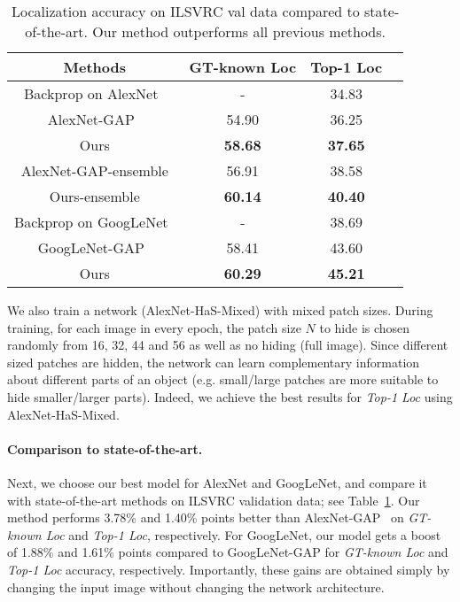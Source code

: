 \documentclass[10pt,twocolumn,letterpaper]{article}
\begin{document}
\begin{table}[t!]
\begin{center}
    \footnotesize
    \begin{tabular}{| c | c | c| c|}
    \hline    	
    Methods & GT-known Loc &  Top-1 Loc    \\
    \hline
    Backprop on AlexNet~\cite{simonyan-iclr2014} & - & 34.83 \\
    AlexNet-GAP~\cite{zhou-cvpr2016}  &  54.90 & 36.25\\
    
    Ours         & \textbf{58.68} & \textbf{37.65}  \\
    \hline
    AlexNet-GAP-ensemble   & 56.91 & 38.58 \\
    Ours-ensemble       & \textbf{60.14} & \textbf{40.40}   \\
            \hline
     Backprop on GoogLeNet~\cite{simonyan-iclr2014} & - & 38.69 \\
         GoogLeNet-GAP~\cite{zhou-cvpr2016} & 58.41 & 43.60 \\
         Ours         &  \textbf{60.29} & \textbf{45.21} \\
     \hline
    \end{tabular}
    \caption{Localization accuracy on ILSVRC val data compared to state-of-the-art.  Our method outperforms all previous methods.}
    \label{table:main_results}
\end{center}
\vspace*{-0.15in}
\end{table}
We also train a network (AlexNet-HaS-Mixed) with mixed patch sizes. During training, for each image in every epoch, the patch size $N$ to hide is chosen randomly from 16, 32, 44 and 56 as well as no hiding (full image).  Since different sized patches are hidden, the network can learn complementary information about different parts of an object (e.g. small/large patches are more suitable to hide smaller/larger parts). Indeed, we achieve the best results for \emph{Top-1 Loc} using AlexNet-HaS-Mixed. 

\vspace{-10pt}\paragraph{Comparison to state-of-the-art.}  Next, we choose our best model for AlexNet and GoogLeNet, and compare it with state-of-the-art methods on ILSVRC validation data; see Table~\ref{table:main_results}. Our method performs 3.78\% and 1.40\% points better than AlexNet-GAP~\cite{zhou-cvpr2016} on \emph{GT-known Loc} and \emph{Top-1 Loc}, respectively. For GoogLeNet, our model gets a boost of 1.88\% and 1.61\% points compared to GoogLeNet-GAP for \emph{GT-known Loc} and \emph{Top-1 Loc} accuracy, respectively.  Importantly, these gains are obtained simply by changing the input image without changing the network architecture.
\end{document}
